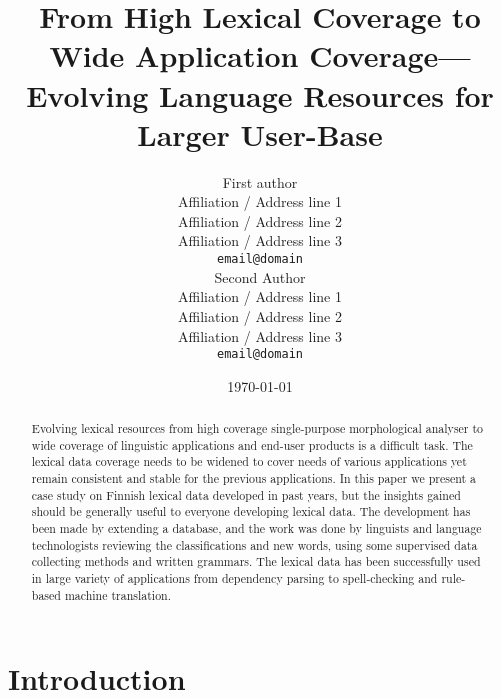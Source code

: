 \documentclass[11pt]{article}
\title{From High Lexical Coverage to Wide Application Coverage---Evolving
Language Resources for Larger User-Base}
\author{First author \\
  Affiliation / Address line 1 \\
  Affiliation / Address line 2 \\
  Affiliation / Address line 3 \\
  {\tt email@domain} \\\And
  Second Author \\
  Affiliation / Address line 1 \\
  Affiliation / Address line 2 \\
  Affiliation / Address line 3 \\
  {\tt email@domain} \\}
\date{\today}
\begin{document}
\maketitle

\begin{abstract}
    Evolving lexical resources from high coverage single-purpose morphological
    analyser to wide coverage of linguistic applications and end-user products
    is a difficult task. The lexical data coverage needs to be widened to cover
    needs of various applications yet remain consistent and stable for the
    previous applications. In this paper we present a case study on Finnish
    lexical data developed in past years, but the insights gained should be
    generally useful to everyone developing lexical data. The development has
    been made by extending a database, and the work was done by linguists and
    language technologists reviewing the classifications and new words, using
    some supervised data collecting methods and written grammars.  The lexical
    data has been successfully used in large variety of applications from
    dependency parsing to spell-checking and rule-based machine translation. 
\end{abstract}


\section{Introduction}
\label{sec:intro}

% 
\end{document}

